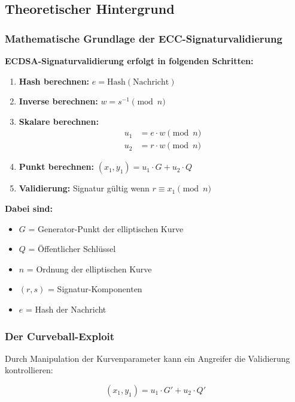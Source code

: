 \documentclass{article}
\begin{document}
\subsection{Theoretischer Hintergrund}

\subsubsection{Mathematische Grundlage der ECC-Signaturvalidierung}

\textbf{ECDSA-Signaturvalidierung erfolgt in folgenden Schritten:}

\begin{enumerate}
    \item \textbf{Hash berechnen:} $e = \text{Hash}(\text{Nachricht})$
    \item \textbf{Inverse berechnen:} $w = s^{-1} \pmod{n}$
    \item \textbf{Skalare berechnen:} 
    \begin{align}
    u_1 &= e \cdot w \pmod{n} \\
    u_2 &= r \cdot w \pmod{n}
    \end{align}
    \item \textbf{Punkt berechnen:} $(x_1, y_1) = u_1 \cdot G + u_2 \cdot Q$
    \item \textbf{Validierung:} Signatur gültig wenn $r \equiv x_1 \pmod{n}$
\end{enumerate}

\textbf{Dabei sind:}
\begin{itemize}
    \item $G$ = Generator-Punkt der elliptischen Kurve
    \item $Q$ = Öffentlicher Schlüssel  
    \item $n$ = Ordnung der elliptischen Kurve
    \item $(r,s)$ = Signatur-Komponenten
    \item $e$ = Hash der Nachricht
\end{itemize}

\subsubsection{Der Curveball-Exploit}

Durch Manipulation der Kurvenparameter kann ein Angreifer die Validierung kontrollieren:

\begin{equation}
(x_1, y_1) = u_1 \cdot G' + u_2 \cdot Q'
\end{equation}
\end{document}
